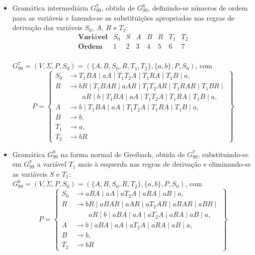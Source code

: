 \documentclass[12pt]{article}
\def\myling{{99}} %
\begin{document}
\begin{tcolorbox}[breakable,rounded corners, colback=yellow!5, colframe=red!40!black, title={Forma normal de Greibach.}]
\begin{itemize}
  \item Gramática intermediária $G_{\myling}^7$, obtida de $G_{\myling}^6$, definindo-se números de ordem para as variáveis e fazendo-se as substituições apropriadas nas regras de derivação das variáveis $S_0$, $A$, $R$ e $T_2$:
      $$
       \begin{array}{l|ccccccccccc}
        \textbf{Variável} & S_0 & S & A & B & R & T_1 & T_2\\
        \hline
        \textbf{Ordem}    &   1 & 2 & 3 & 4 & 5 & 6   & 7\\
       \end{array}
      $$
  
  \noindent
  $G_{\myling}^7=(V,\Sigma,P,S_0)=(\{A,B,S_0,R,T_1,T_2\},\{a,b\},P,S_0)$, com
    \[P=\left\{
     \begin{aligned}
      S_0 & \to T_1BA\mid aA\mid T_1T_2A\mid T_1RA\mid T_1B\mid a, \\
      R   & \to bR\mid T_1BAR\mid aAR\mid T_1T_2AR\mid T_1RAR\mid T_1BR\mid\\
          & \qquad aR\mid b\mid T_1BA\mid aA\mid T_1T_2A\mid T_1RA\mid T_1B\mid a, \\
      A   & \to b\mid T_1BA\mid aA\mid T_1T_2A\mid T_1RA\mid T_1B\mid a, \\
      B   & \to b,\\
      T_1 & \to a,\\
      T_2 & \to bR
     \end{aligned}
    \right\}\]
  \item Gramática $G_{\myling}^8$ na forma normal de Greibach, obtida de $G_{\myling}^7$, substituindo-se em $G_{\myling}^7$ a variável $T_1$ mais à esquerda nas regras de derivação e eliminando-se as variáveis $S$ e $T_1$:\\
  $G_{\myling}^8=(V,\Sigma,P,S_0)=(\{A,B,S_0,R,T_2\},\{a,b\},P,S_0)$, com
    \[P=\left\{
     \begin{aligned}
      S_0 & \to aBA\mid aA\mid aT_2A\mid aRA\mid aB\mid a, \\
      R   & \to bR\mid aBAR\mid aAR\mid aT_2AR\mid aRAR\mid aBR\mid\\
          & \qquad aR\mid b\mid aBA\mid aA\mid aT_2A\mid aRA\mid aB\mid a, \\
      A   & \to b\mid aBA\mid aA\mid aT_2A\mid aRA\mid aB\mid a, \\
      B   & \to b,\\
      T_2 & \to bR
     \end{aligned}
    \right\}\]
\end{itemize}
\end{tcolorbox}
\end{document}
